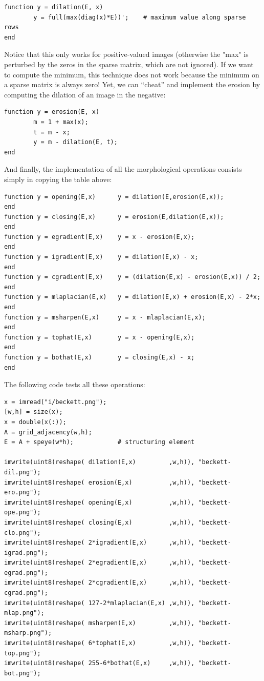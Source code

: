 \begin{verbatim}
function y = dilation(E, x)
        y = full(max(diag(x)*E))';    # maximum value along sparse rows
end
\end{verbatim}

Notice that this only works for positive-valued images (otherwise the "max"
is perturbed by the zeros in the sparse matrix, which are not ignored).  If
we want to compute the minimum, this technique does not work because the
minimum on a sparse matrix is always zero!  Yet, we can ``cheat'' and
implement the erosion by computing the dilation of an image in the negative:

\begin{verbatim}
function y = erosion(E, x)
        m = 1 + max(x);
        t = m - x;
        y = m - dilation(E, t);
end
\end{verbatim}

And finally, the implementation of all the morphological operations consists
simply in copying the table above:

\begin{verbatim}
function y = opening(E,x)      y = dilation(E,erosion(E,x));              end
function y = closing(E,x)      y = erosion(E,dilation(E,x));              end
function y = egradient(E,x)    y = x - erosion(E,x);                      end
function y = igradient(E,x)    y = dilation(E,x) - x;                     end
function y = cgradient(E,x)    y = (dilation(E,x) - erosion(E,x)) / 2;    end
function y = mlaplacian(E,x)   y = dilation(E,x) + erosion(E,x) - 2*x;    end
function y = msharpen(E,x)     y = x - mlaplacian(E,x);                   end
function y = tophat(E,x)       y = x - opening(E,x);                      end
function y = bothat(E,x)       y = closing(E,x) - x;                      end
\end{verbatim}

The following code tests all these operations:

\begin{verbatim}
x = imread("i/beckett.png");
[w,h] = size(x);
x = double(x(:));
A = grid_adjacency(w,h);
E = A + speye(w*h);            # structuring element

imwrite(uint8(reshape( dilation(E,x)         ,w,h)), "beckett-dil.png");
imwrite(uint8(reshape( erosion(E,x)          ,w,h)), "beckett-ero.png");
imwrite(uint8(reshape( opening(E,x)          ,w,h)), "beckett-ope.png");
imwrite(uint8(reshape( closing(E,x)          ,w,h)), "beckett-clo.png");
imwrite(uint8(reshape( 2*igradient(E,x)      ,w,h)), "beckett-igrad.png");
imwrite(uint8(reshape( 2*egradient(E,x)      ,w,h)), "beckett-egrad.png");
imwrite(uint8(reshape( 2*cgradient(E,x)      ,w,h)), "beckett-cgrad.png");
imwrite(uint8(reshape( 127-2*mlaplacian(E,x) ,w,h)), "beckett-mlap.png");
imwrite(uint8(reshape( msharpen(E,x)         ,w,h)), "beckett-msharp.png");
imwrite(uint8(reshape( 6*tophat(E,x)         ,w,h)), "beckett-top.png");
imwrite(uint8(reshape( 255-6*bothat(E,x)     ,w,h)), "beckett-bot.png");
\end{verbatim}

